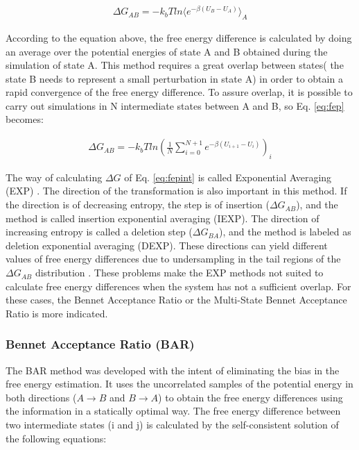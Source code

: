 \begin{equation}
\label{eq:fep}
\begin{aligned}
\Delta G_{AB} = -k_{b}T ln \langle{e^{-\beta (U_{B}-U_{A})}}\rangle_{A}
\end{aligned}
\end{equation}

According to the equation above, the free energy difference is calculated by doing an average over the potential energies of state A and B obtained during the simulation of state A. This method requires a great overlap between states( the state B needs to represent a small perturbation in state A) in order to obtain a rapid convergence of the free energy difference. To assure overlap, it is possible to carry out simulations in N intermediate states between A and B, so Eq. \eqref{eq:fep} becomes:

\begin{equation}
\label{eq:fepint}
\begin{aligned}
\Delta G_{AB} = -k_{b}T  ln \left(\frac{1}{N}\sum_{i=0}^{N+1}
{e^{-\beta (U_{i+1}-U_{i})}}\right)_{i}
\end{aligned}
\end{equation}

The way of calculating $\Delta G$ of Eq. \eqref{eq:fepint} is called Exponential Averaging (EXP) \cite{zwanzig1955,bareva}. The direction of the transformation is also important in this method. If the direction is of decreasing entropy, the step is of insertion ($\Delta G_{AB}$), and the method is called insertion exponential averaging (IEXP). The direction of increasing entropy is called a deletion step ($\Delta G_{BA}$), and the method is labeled as deletion exponential averaging (DEXP). These directions can yield different values of free energy differences due to undersampling in the tail regions of the $\Delta G_{AB}$ distribution \cite{klimovich,pohorille2010}. These problems make the EXP methods not suited to calculate free energy differences when the system has not a sufficient overlap. For these cases, the Bennet Acceptance Ratio or the Multi-State Bennet Acceptance Ratio is more indicated.   

\subsubsection{Bennet Acceptance Ratio (BAR)}

The BAR method \cite{bennet1976} was developed with the intent of eliminating the bias in the free energy estimation. It uses the uncorrelated samples of the potential energy in both directions ($A \rightarrow B$ and $B \rightarrow A$) to obtain the free energy differences using the information in a statically optimal way. The free energy difference between two intermediate states (i and j) is calculated by the self-consistent solution of the following equations: 

